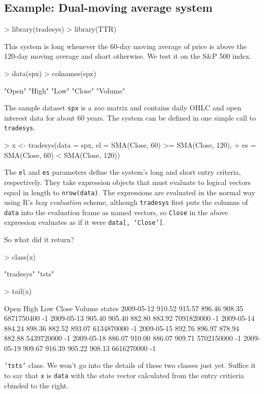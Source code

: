 \documentclass[a4]{article}
\newcommand{\code}[1]{\texttt{#1}}
\begin{document}
\subsection{Example: Dual-moving average system}
\begin{Schunk}
\begin{Sinput}
> library(tradesys)
> library(TTR)
\end{Sinput}
\end{Schunk}
This system is long whenever the 60-day moving average of price is
above the 120-day moving average and short otherwise. We test it on
the S\&P 500 index.
\begin{Schunk}
\begin{Sinput}
> data(spx)
> colnames(spx)
\end{Sinput}
\begin{Soutput}
[1] "Open"   "High"   "Low"    "Close"  "Volume"
\end{Soutput}
\end{Schunk}
The sample dataset \code{spx} is a zoo matrix and contains daily
OHLC and open interest data for about 60 years. The system can be
defined in one simple call to \code{tradesys}.
\begin{Schunk}
\begin{Sinput}
> x <- tradesys(data = spx, el = SMA(Close, 60) >= SMA(Close, 120), 
+     es = SMA(Close, 60) < SMA(Close, 120))
\end{Sinput}
\end{Schunk}
The \code{el} and \code{es} parameters define the system's long and
short entry criteria, respectively. They take expression objects that
must evaluate to logical vectors equal in length to \code{nrow(data)}.
The expressions are evaluated in the normal way using R's \emph{lazy
  evaluation} scheme, although \code{tradesys} first puts the columns
of \code{data} into the evaluation frame as named vectors, so
\code{Close} in the above expression evaluates as if it were
\code{data[, `Close']}.

So what did it return?
\begin{Schunk}
\begin{Sinput}
> class(x)
\end{Sinput}
\begin{Soutput}
[1] "tradesys" "tsts"    
\end{Soutput}
\begin{Sinput}
> tail(x)
\end{Sinput}
\begin{Soutput}
             Open   High    Low  Close     Volume states
2009-05-12 910.52 915.57 896.46 908.35 6871750400     -1
2009-05-13 905.40 905.40 882.80 883.92 7091820000     -1
2009-05-14 884.24 898.36 882.52 893.07 6134870000     -1
2009-05-15 892.76 896.97 878.94 882.88 5439720000     -1
2009-05-18 886.07 910.00 886.07 909.71 5702150000     -1
2009-05-19 909.67 916.39 905.22 908.13 6616270000     -1
\end{Soutput}
\end{Schunk}
\code{'tsts'} class. We won't go into the details of these two classes
just yet. Suffice it to say that \code{x} is \code{data} with the
state vector calculated from the entry critieria cbinded to the right.
\end{document}
